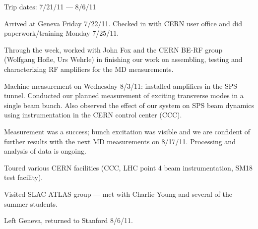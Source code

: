 \documentclass{article}
\begin{document}
\begin{flushleft}
Trip dates: 7/21/11 --- 8/6/11
\end{flushleft}

Arrived at Geneva Friday 7/22/11. 
Checked in with CERN user office and did paperwork/training Monday 7/25/11. 

Through the week, worked with John Fox and the CERN BE-RF group (Wolfgang Hofle, Urs Wehrle) in finishing our work on assembling, testing and characterizing RF amplifiers for the MD measurements.

Machine measurement on Wednesday 8/3/11: installed amplifiers in the SPS tunnel. Conducted our planned measurement of exciting transverse modes in a single beam bunch.
Also observed the effect of our system on SPS beam dynamics using instrumentation in the CERN control center (CCC).

Measurement was a success; bunch excitation was visible and we are confident of further results with the next MD measurements on 8/17/11. Processing and analysis of data is ongoing.

Toured various CERN facilities (CCC, LHC point 4 beam instrumentation, SM18 test facility).

Visited SLAC ATLAS group --- met with Charlie Young and several of the summer students.

Left Geneva, returned to Stanford 8/6/11.
\end{document}
